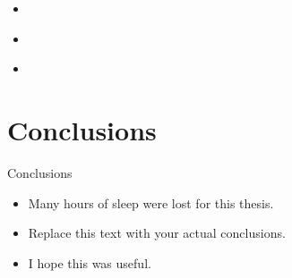 \documentclass[a4,compress]{beamer}
\theoremstyle{plain}
\theoremstyle{definition}
\begin{document}
\begin{frame}
  \begin{itemize}
    \item 
  \end{itemize}
\end{frame}


\begin{frame}
  \begin{itemize}
    \item 
  \end{itemize}
\end{frame}


\begin{frame}
  \begin{itemize}
    \item 
  \end{itemize}
\end{frame}

\section{Conclusions}


\begin{frame}{Conclusions}
  \begin{itemize}
    \item Many hours of sleep were lost for this thesis.
    \item Replace this text with your actual conclusions.
    \item I hope this was useful.
  \end{itemize}
\end{frame}
\end{document}
